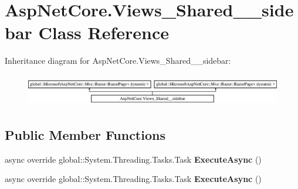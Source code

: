 \hypertarget{class_asp_net_core_1_1_views___shared____sidebar}{}\section{Asp\+Net\+Core.\+Views\+\_\+\+Shared\+\_\+\+\_\+sidebar Class Reference}
\label{class_asp_net_core_1_1_views___shared____sidebar}
Inheritance diagram for Asp\+Net\+Core.\+Views\+\_\+\+Shared\+\_\+\+\_\+sidebar\+:\begin{figure}[H]
\begin{center}
\leavevmode
\includegraphics[height=1.432225cm]{class_asp_net_core_1_1_views___shared____sidebar}
\end{center}
\end{figure}
\subsection*{Public Member Functions}
\begin{DoxyCompactItemize}
\item 
\mbox{\label{class_asp_net_core_1_1_views___shared____sidebar_a9c43110f5ee2277de60b675b884e7da1}} 
async override global\+::\+System.\+Threading.\+Tasks.\+Task {\bfseries Execute\+Async} ()
\item 
\mbox{\label{class_asp_net_core_1_1_views___shared____sidebar_a9c43110f5ee2277de60b675b884e7da1}} 
async override global\+::\+System.\+Threading.\+Tasks.\+Task {\bfseries Execute\+Async} ()
\end{DoxyCompactItemize}
